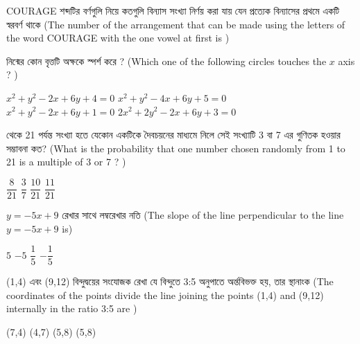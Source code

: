 \documentclass[addpoints]{exam}
\begin{document}
\begin{questions}
\question  COURAGE শব্দটির বর্ণগুলি নিয়ে কতগুলি বিন্যাস সংখ্যা নির্ণয় করা যায় যেন প্রত্যেক বিন্যাসের প্রথমে একটি স্বরবর্ণ থাকে (The number of the arrangement that can be made using the letters of the word COURAGE with the one vowel at first is )

\begin{oneparchoices}

\end{oneparchoices}

\question  নিন্মের কোন বৃত্তটি অক্ষকে স্পর্শ করে ? (Which one of the following circles touches the $ x $ axis ? )

\begin{oneparchoices}
\choice $ x^{2} + y^{2}-2x+6y+4=0 $
\choice $ x^{2} + y^{2}-4x+6y+5=0 $\\
\hspace*{-.35cm}\choice $ x^{2} + y^{2}-2x+6y+1=0 $
\choice $ 2x^{2} + 2y^{2}-2x+6y+3=0 $

\end{oneparchoices}

  থেকে 21 পর্যন্ত সংখ্যা হতে যেকোন একটিকে দৈবচয়নের মাধ্যমে নিলে সেই সংখ্যাটি 3 বা 7 এর গুণিতক হওয়ার সম্ভাবনা কত? (What is the probability that one number chosen randomly from 1 to 21 is a multiple of 3 or 7 ? )

\begin{oneparchoices}
\choice $ \dfrac{8}{21} $
\choice $ \dfrac{3}{7} $
\choice $ \dfrac{10}{21} $
\choice $ \dfrac{11}{21} $

\end{oneparchoices}

\question  $ y = -5x+9 $ রেখার সাথে লম্বরেখার ‍নতি (The slope of the line perpendicular to the line $ y = -5x+9 $ is)

\begin{oneparchoices}
\choice $ 5 $
\choice $ -5 $
\choice $ \dfrac{1}{5} $
\choice $- \dfrac{1}{5}$

\end{oneparchoices}


\question  (1,4) এবং (9,12) বিন্দুদ্বয়ের সংযোজক রেখা যে বিন্দুতে 3:5 অনুপাতে অর্ন্তবিভক্ত হয়, তার স্থানাংক (The coordinates of the points divide the line joining the points (1,4) and (9,12) internally in the ratio 3:5 are )

\begin{oneparchoices}
\choice (7,4)
\choice (4,7)
\choice (5,8)
\choice (5,8)
\end{oneparchoices}


\end{questions}
\end{document}
